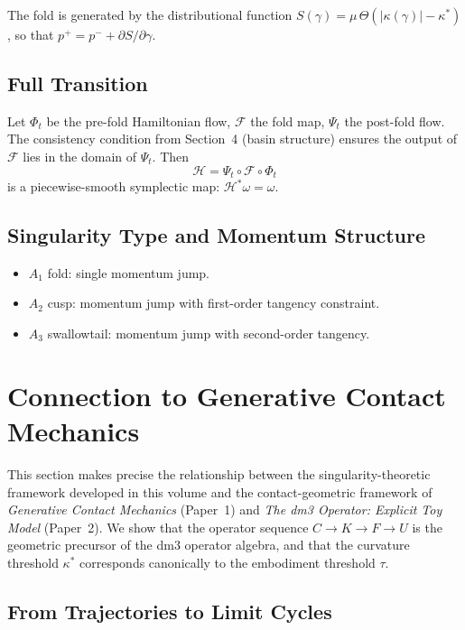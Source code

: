 \documentclass[12pt, oneside]{book}
\theoremstyle{plain}
\theoremstyle{definition}
\theoremstyle{remark}
\begin{document}
The fold is generated by the distributional function
$S(\gamma) = \mu\,\Theta(|\kappa(\gamma)| - \kappa^*)$, so that
$p^+ = p^- + \partial S/\partial\gamma$.

\subsection{Full Transition}

Let $\Phi_t$ be the pre-fold Hamiltonian flow, $\mathcal{F}$ the fold
map, $\Psi_t$ the post-fold flow. The consistency condition from
Section~4 (basin structure) ensures the output of $\mathcal{F}$ lies
in the domain of $\Psi_t$. Then
\[
\mathcal{H} = \Psi_t \circ \mathcal{F} \circ \Phi_t
\]
is a piecewise-smooth symplectic map: $\mathcal{H}^*\omega = \omega$.

\subsection{Singularity Type and Momentum Structure}

\begin{itemize}
\item $A_1$ fold: single momentum jump.
\item $A_2$ cusp: momentum jump with first-order tangency constraint.
\item $A_3$ swallowtail: momentum jump with second-order tangency.
\end{itemize}

\section{Connection to Generative Contact Mechanics}
\label{sec:connection}

This section makes precise the relationship between the
singularity-theoretic framework developed in this volume and the
contact-geometric framework of \emph{Generative Contact Mechanics}
(Paper~1) and \emph{The dm3 Operator: Explicit Toy Model}
(Paper~2). We show that the operator sequence
$C \to K \to F \to U$
is the geometric precursor of the dm3 operator algebra, and that the
curvature threshold $\kappa^*$ corresponds canonically to the
embodiment threshold $\tau$.

\subsection{From Trajectories to Limit Cycles}
\end{document}
